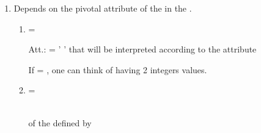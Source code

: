 \begin{enumerate}
\begin{enumerate}
\end{enumerate}

\smallskip
\item {}

\smallskip
Depends on the  pivotal attribute   of the
  in the  .

\begin{enumerate}

\item  {} = 

\begin{tabbing}
\end{tabbing}

\begin{tabbing}
\ptn Att.:  = ' ' \tagsp \strng that will be interpreted
                          according to the  attribute 
\end{tabbing}

\trt If   = ,  one can think of having 2
integers values.

\smallskip
\item {} = 

\begin{tabbing}
\\[\taglnskp]
\tagindent\BTRE  \tagsp    of the   defined by  \\[\taglnskp]
\end{tabbing}

\end{enumerate}

\end{enumerate}
\setcounter{enumitemp}{\value{enumi}}

\newpage 
